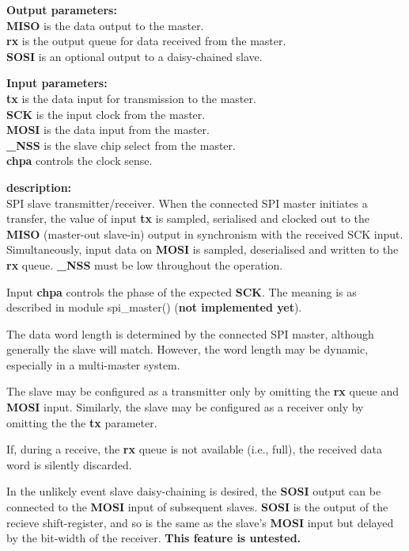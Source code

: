             {\bf Output parameters:} \\
            {\bf MISO} is the data output to the master.\\
            {\bf rx} is the output queue for data received from the master.\\
            {\bf SOSI} is an optional output to a daisy-chained slave.

            {\bf Input parameters:} \\
            {\bf tx} is the data input for transmission to the master.\\
            {\bf SCK} is the input clock from the master.\\
            {\bf MOSI} is the data input from the master.\\
            {\bf \_NSS} is the slave chip select from the master.\\
            {\bf chpa} controls the clock sense.

            {\bf description:} \\
            SPI slave transmitter/receiver. When the connected SPI master initiates
            a transfer, the value of input {\bf tx} is sampled, serialised and
            clocked out to the {\bf MISO} (master-out slave-in) output in
            synchronism with the received SCK input. Simultaneously, input data on
            {\bf MOSI} is sampled, deserialised and written to the {\bf rx} queue.
            {\bf \_NSS} must be low throughout the operation.

            Input {\bf chpa} controls the phase of the expected {\bf SCK}. The meaning is
            as described in module spi\_master() ({\bf not implemented yet}).

            The data word length is determined by the connected SPI master, although
            generally the slave will match. However, the word length may be dynamic,
            especially in a multi-master system.

            The slave may be configured as a transmitter only by omitting the {\bf
            rx} queue and {\bf MOSI} input. Similarly, the slave may be configured
            as a receiver only by omitting the the {\bf tx} parameter.

            If, during a receive, the {\bf rx} queue is not available (i.e., full),
            the received data word is silently discarded.

            In the unlikely event slave daisy-chaining is desired, the {\bf SOSI}
            output can be connected to the {\bf MOSI} input of subsequent slaves.
            {\bf SOSI} is the  output of the recieve shift-register, and so is the
            same as the slave's {\bf MOSI} input but delayed by the bit-width of
            the receiver. {\bf This feature is untested.}




